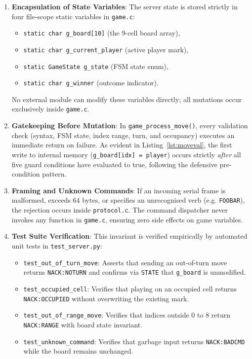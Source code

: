 \begin{enumerate}
    \item \textbf{Encapsulation of State Variables}: The server state is stored strictly in four file-scope static variables in \texttt{game.c}:
    \begin{itemize}
        \item \texttt{static char g\_board[10]} (the 9-cell board array),
        \item \texttt{static char g\_current\_player} (active player mark),
        \item \texttt{static GameState g\_state} (FSM state enum),
        \item \texttt{static char g\_winner} (outcome indicator).
    \end{itemize}
    No external module can modify these variables directly; all mutations occur exclusively inside \texttt{game.c}.
    \item \textbf{Gatekeeping Before Mutation}: In \texttt{game\_process\_move()}, every validation check (syntax, FSM state, index range, turn, and occupancy) executes an immediate return on failure.
    As evident in Listing~\ref{lst:moveval}, the first write to internal memory (\texttt{g\_board[idx] = player}) occurs strictly \emph{after} all five guard conditions have evaluated to true, following the defensive pre-condition pattern.
    \item \textbf{Framing and Unknown Commands}: If an incoming serial frame is malformed, exceeds 64 bytes, or specifies an unrecognised verb (e.g. \texttt{FOOBAR}), the rejection occurs inside \texttt{protocol.c}.
    The command dispatcher never invokes any function in \texttt{game.c}, ensuring zero side effects on game variables.
    \item \textbf{Test Suite Verification}: This invariant is verified empirically by automated unit tests in \texttt{test\_server.py}:
    \begin{itemize}
        \item \texttt{test\_out\_of\_turn\_move}: Asserts that sending an out-of-turn move returns \texttt{NACK:NOTURN} and confirms via \texttt{STATE} that \texttt{g\_board} is unmodified.
        \item \texttt{test\_occupied\_cell}: Verifies that playing on an occupied cell returns \texttt{NACK:OCCUPIED} without overwriting the existing mark.
        \item \texttt{test\_out\_of\_range\_move}: Verifies that indices outside 0 to 8 return \texttt{NACK:RANGE} with board state invariant.
        \item \texttt{test\_unknown\_command}: Verifies that garbage input returns \texttt{NACK:BADCMD} while the board remains unchanged.
    \end{itemize}
\end{enumerate}

